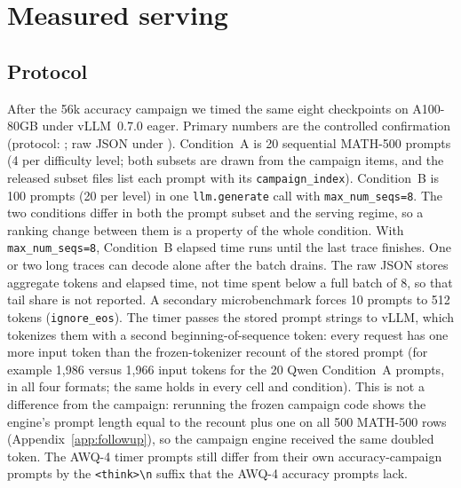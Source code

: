 \documentclass[11pt,a4paper]{article}
\begin{document}
\section{Measured serving}
\label{app:serving}
\subsection{Protocol}
\label{sec:measured-serving}
After the 56k accuracy campaign we timed the same eight checkpoints on A100-80GB under vLLM~0.7.0 eager. Primary numbers are the controlled confirmation (protocol: ; raw JSON under ). Condition~A is 20 sequential MATH-500 prompts (4 per difficulty level; both subsets are drawn from the campaign items, and the released subset files list each prompt with its \texttt{campaign\_index}). Condition~B is 100 prompts (20 per level) in one \texttt{llm.generate} call with \texttt{max\_num\_seqs=8}. The two conditions differ in both the prompt subset and the serving regime, so a ranking change between them is a property of the whole condition. With \texttt{max\_num\_seqs=8}, Condition~B elapsed time runs until the last trace finishes. One or two long traces can decode alone after the batch drains. The raw JSON stores aggregate tokens and elapsed time, not time spent below a full batch of 8, so that tail share is not reported. A secondary microbenchmark forces 10 prompts to 512 tokens (\texttt{ignore\_eos}). The timer passes the stored prompt strings to vLLM, which tokenizes them with a second beginning-of-sequence token: every request has one more input token than the frozen-tokenizer recount of the stored prompt (for example 1{,}986 versus 1{,}966 input tokens for the 20 Qwen Condition~A prompts, in all four formats; the same holds in every cell and condition). This is not a difference from the campaign: rerunning the frozen campaign code shows the engine's prompt length equal to the recount plus one on all 500 MATH-500 rows (Appendix~\ref{app:followup}), so the campaign engine received the same doubled token. The AWQ-4 timer prompts still differ from their own accuracy-campaign prompts by the \texttt{<think>\textbackslash n} suffix that the AWQ-4 accuracy prompts lack.
\end{document}
